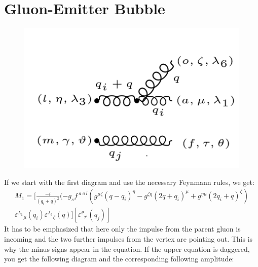 \section{Gluon-Emitter Bubble}
\begin{figure}[ht!]
\centering
\includegraphics[scale=0.7]{images/GG/M1gg.png}
\end{figure}
If we start with the first diagram and use the necessary Feynmann rules, we get:
\begin{equation}
\begin{split}
M_1=[\frac{-i}{(q_i +q)^2}(-g_s f^{\:a\:o\:l}(g^{{\mu}{\zeta}}(q-q_i)^{\eta}-g^{{\zeta}{\eta}}(2q +q_i)^{\mu}+g^{{\eta}{\mu}}(2q_i +q)^{\zeta})\\
{\varepsilon^{\lambda_1}}_{\mu} (q_i) {\varepsilon^{\lambda_6}}_{\zeta} (q)][{{\varepsilon^{\theta}}_{{\tau}^{\prime}}} (q_j)]
\end{split}
\end{equation}
It has to be emphasized that here only the impulse from the parent gluon is incoming and the two further impulses from the vertex are pointing out. This is why the minus signs appear in the equation.
If the upper equation is daggered, you get the following diagram and the corresponding following amplitude:

